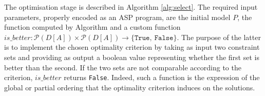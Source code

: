 
The optimisation stage is described in Algorithm \ref{alg:select}. The required input parameters, properly encoded as an \ac{ASP} program, are the initial model $P$, the \textit{\sheriff} function computed by Algorithm \label{alg:cand} and a custom function ${is\_better}:\mathcal{P}({D[A]})\times\mathcal{P}({D[A]})\rightarrow \{\texttt{True},\ \texttt{False}\}$. The purpose of the latter is to implement the chosen optimality criterion by taking as input two constraint sets and providing as output a boolean value representing whether the first set is better than the second. If the two sets are not comparable according to the criterion, ${is\_better}$ returns \texttt{False}. Indeed, such a function is the expression of the global or partial ordering that the optimality criterion induces on the solutions. 




